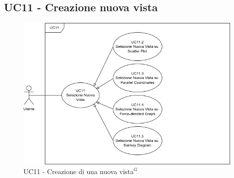 \newpage

\subsection{UC11 - Creazione nuova vista}
\label{sec:UC11}
\begin{figure}[h!]
    \centering
    \includegraphics[scale=0.60]{../../assets/creazione_vista.png}
    \caption{UC11 - Creazione di una nuova vista$^{G}$}
\end{figure}
